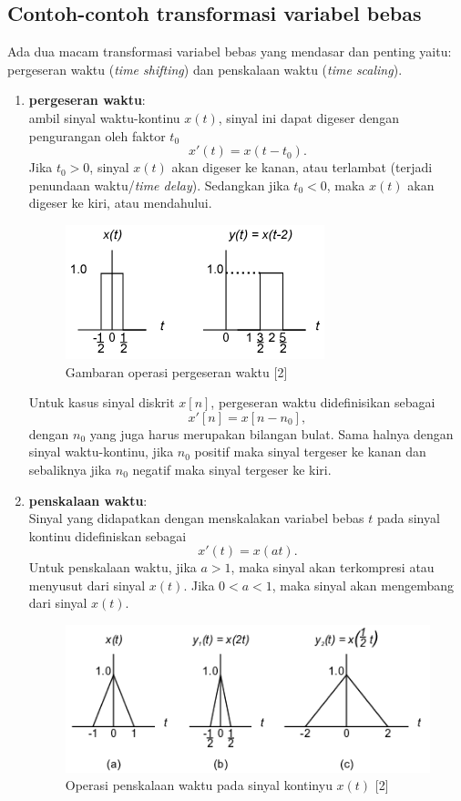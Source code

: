 \subsection{Contoh-contoh transformasi variabel bebas}
Ada dua macam transformasi variabel bebas yang mendasar dan penting yaitu: pergeseran waktu (\textit{time shifting}) dan penskalaan waktu (\textit{time scaling}).
\begin{enumerate}
\item \textbf{pergeseran waktu}:\\
ambil sinyal waktu-kontinu $x(t)$, sinyal ini dapat digeser dengan pengurangan oleh faktor $t_0$
\[
x'(t)=x(t-t_0).
\] 
Jika $t_0>0$, sinyal $x(t)$ akan digeser ke kanan, atau terlambat (terjadi penundaan waktu/\textit{time delay}). Sedangkan jika $t_0<0$, maka $x(t)$ akan digeser ke kiri, atau mendahului. 

\begin{figure}[!h]
\centering
\includegraphics[scale=0.9]{pict/timeshift}
\caption{Gambaran operasi pergeseran waktu [2]}\label{timeshift}
\end{figure}

Untuk kasus sinyal diskrit $x[n]$, pergeseran waktu didefinisikan sebagai
\[
x'[n]=x[n-n_0],
\]
dengan $n_0$ yang juga harus merupakan bilangan bulat. Sama halnya dengan sinyal waktu-kontinu, jika $n_0$ positif maka sinyal tergeser ke kanan dan sebaliknya jika $n_0$ negatif maka sinyal tergeser ke kiri.

\item \textbf{penskalaan waktu}:\\
Sinyal yang didapatkan dengan menskalakan variabel bebas $t$ pada sinyal kontinu didefiniskan sebagai
\begin{equation}
x'(t)=x(at).
\end{equation} 
Untuk penskalaan waktu, jika $a>1$, maka sinyal akan terkompresi atau menyusut dari sinyal $x(t)$. Jika $0<a<1$, maka sinyal akan mengembang dari sinyal $x(t)$.

\begin{figure}[!h]
\centering
\includegraphics[scale=0.7]{pict/timescaling}
\caption{Operasi penskalaan waktu pada sinyal kontinyu $x(t)$ [2]}
\end{figure}


\end{enumerate}
